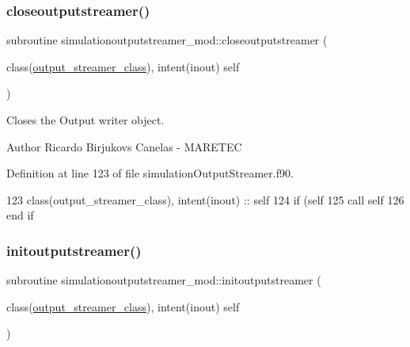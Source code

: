 \subsubsection{\texorpdfstring{closeoutputstreamer()}{closeoutputstreamer()}}
{\footnotesize\ttfamily subroutine simulationoutputstreamer\+\_\+mod\+::closeoutputstreamer (\begin{DoxyParamCaption}\item[{class(\mbox{\hyperlink{structsimulationoutputstreamer__mod_1_1output__streamer__class}{output\+\_\+streamer\+\_\+class}}), intent(inout)}]{self }\end{DoxyParamCaption})\hspace{0.3cm}{\ttfamily [private]}}



Closes the Output writer object. 

\begin{DoxyAuthor}{Author}
Ricardo Birjukovs Canelas -\/ M\+A\+R\+E\+T\+EC 
\end{DoxyAuthor}


Definition at line 123 of file simulation\+Output\+Streamer.\+f90.


\begin{DoxyCode}
123     \textcolor{keywordtype}{class}(output\_streamer\_class), \textcolor{keywordtype}{intent(inout)} :: self
124     \textcolor{keywordflow}{if} (self%
125         \textcolor{keyword}{call }self%
126 \textcolor{keywordflow}{    end if}
\end{DoxyCode}
\mbox{\label{namespacesimulationoutputstreamer__mod_a9ab3e2101fbed18ea896729f7201e1aa}} 
\subsubsection{\texorpdfstring{initoutputstreamer()}{initoutputstreamer()}}
{\footnotesize\ttfamily subroutine simulationoutputstreamer\+\_\+mod\+::initoutputstreamer (\begin{DoxyParamCaption}\item[{class(\mbox{\hyperlink{structsimulationoutputstreamer__mod_1_1output__streamer__class}{output\+\_\+streamer\+\_\+class}}), intent(inout)}]{self }\end{DoxyParamCaption})\hspace{0.3cm}{\ttfamily [private]}}



